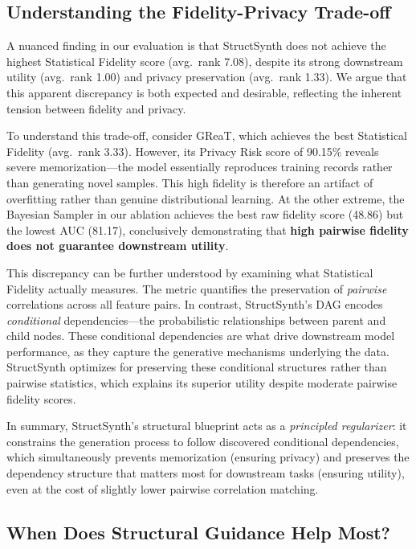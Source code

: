 \subsection{Understanding the Fidelity-Privacy Trade-off}
\label{sec:fidelity_discussion}

A nuanced finding in our evaluation is that StructSynth does not achieve the highest Statistical Fidelity score (avg.\ rank 7.08), despite its strong downstream utility (avg.\ rank 1.00) and privacy preservation (avg.\ rank 1.33). We argue that this apparent discrepancy is both expected and desirable, reflecting the inherent tension between fidelity and privacy.

To understand this trade-off, consider GReaT, which achieves the best Statistical Fidelity (avg.\ rank 3.33). However, its Privacy Risk score of 90.15\% reveals severe memorization---the model essentially reproduces training records rather than generating novel samples. This high fidelity is therefore an artifact of overfitting rather than genuine distributional learning. At the other extreme, the Bayesian Sampler in our ablation achieves the best raw fidelity score (48.86) but the lowest AUC (81.17), conclusively demonstrating that \textbf{high pairwise fidelity does not guarantee downstream utility}.

This discrepancy can be further understood by examining what Statistical Fidelity actually measures. The metric quantifies the preservation of \emph{pairwise} correlations across all feature pairs. In contrast, StructSynth's DAG encodes \emph{conditional} dependencies---the probabilistic relationships between parent and child nodes. These conditional dependencies are what drive downstream model performance, as they capture the generative mechanisms underlying the data. StructSynth optimizes for preserving these conditional structures rather than pairwise statistics, which explains its superior utility despite moderate pairwise fidelity scores.

In summary, StructSynth's structural blueprint acts as a \emph{principled regularizer}: it constrains the generation process to follow discovered conditional dependencies, which simultaneously prevents memorization (ensuring privacy) and preserves the dependency structure that matters most for downstream tasks (ensuring utility), even at the cost of slightly lower pairwise correlation matching.


\subsection{When Does Structural Guidance Help Most?}
\label{sec:when_helps}

